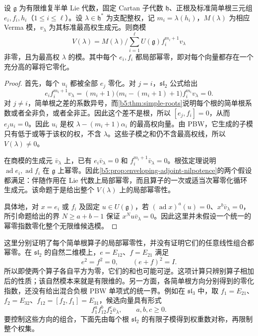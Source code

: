 \begin{lemma}\label{b5:lem:integrable-verma-quotient}
	设 \(\mathfrak g\) 为有限维复半单 Lie 代数，固定 Cartan 子代数 \(\mathfrak h\)、正根及标准简单根三元组 \(e_i,f_i,h_i\)（\(1\le i\le\ell\)）。设 \(\lambda\in\mathfrak h^*\) 为支配整权，记 \(m_i=\lambda(h_i)\)，\(M(\lambda)\) 为相应 Verma 模，\(v_\lambda\) 为其标准最高权生成元。则商模
	\[
		V(\lambda)=M(\lambda)\Big/\sum_{i=1}^\ell U(\mathfrak g)f_i^{m_i+1}v_\lambda
	\]
	非零，且为最高权 \(\lambda\) 的模。其中每个 \(e_i,f_i\) 都局部幂零，即对每个向量都存在一个充分高的幂将它零化。
\end{lemma}
\begin{proof}
	首先，每个 \(u_i\) 都被全部 \(e_j\) 零化。对 \(j=i\)，\(\mathfrak{sl}_2\) 公式给出
	\[
		e_i f_i^{m_i+1}v_\lambda =(m_i+1)\bigl(m_i-(m_i+1)+1\bigr)f_i^{m_i}v_\lambda=0.
	\]
	对 \(j\ne i\)，简单根之差的系数异号，而\cref{b5:thm:simple-roots}说明每个根的简单根系数或者全非负，或者全非正。因此这个差不是根，所以 \([e_j,f_i]=0\)，从而 \(e_ju_i=0\)。因此 \(u_i\) 是权 \(\lambda-(m_i+1)\alpha_i\) 的最高权向量。由 PBW，它生成的子模只有低于或等于该权的权，不含 \(\lambda\)。这些子模之和仍不含最高权线，所以 \(V(\lambda)\ne0\)。

	在商模的生成元 \(\bar v_\lambda\) 上，已有 \(e_i\bar v_\lambda=0\) 和 \(f_i^{m_i+1}\bar v_\lambda=0\)。根弦定理说明 \(\operatorname{ad}e_i,\operatorname{ad}f_i\) 在 \(\mathfrak g\) 上幂零。因此\cref{b5:prop:enveloping-adjoint-nilpotence}的两个假设都满足：伴随作用在 Lie 代数上局部幂零，而且算子的一次或适当次幂零化循环生成元。该命题于是给出整个 \(V(\lambda)\) 上的局部幂零性。

	具体地，对 \(x=e_i\) 或 \(f_i\) 及固定 \(u\in U(\mathfrak g)\)，若 \((\operatorname{ad}x)^a(u)=0\)、\(x^b\bar v_\lambda=0\)，所引命题给出的界 \(N\ge a+b-1\) 保证 \(x^Nu\bar v_\lambda=0\)。因此这里并未假设一个统一的幂零指数零化整个无限维候选模。
\end{proof}

这里分别证明了每个简单根算子的局部幂零性，并没有证明它们的任意线性组合都幂零。在 \(\mathfrak{sl}_2\) 的自然二维模上，\(e=E_{12}\)、\(f=E_{21}\) 满足
\[
	e^2=f^2=0,\qquad (e+f)^2=I.
\]
所以即使两个算子各自平方为零，它们的和也可能可逆。这项计算只辨别算子相加后的性质；该自然模本来就是有限维的。另一方面，各简单根方向分别得到的零化指数，还没有给出混合负根 PBW 单项式的统一界。例如在 \(\mathfrak{sl}_3\) 中，取 \(f_1=E_{21}\)、\(f_2=E_{32}\)、\(f_{12}=[f_2,f_1]=E_{31}\)，候选向量具有形式
\[
	f_1^a f_{12}^b f_2^c\bar v_\lambda, \qquad a,b,c\ge0.
\]
要控制这些方向的组合，下面先由每个根 \(\mathfrak{sl}_2\) 的有限子模得到权重数对称，再限制整个权集。

